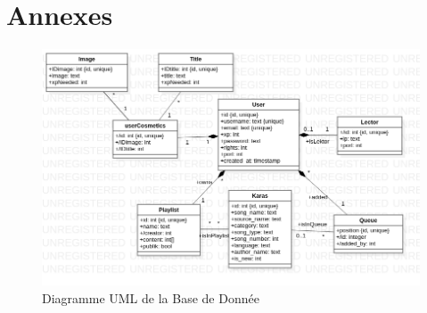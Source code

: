 \section{Annexes}

\begin{figure}
    \begin{center}
        \includegraphics[width=160mm]{UML.png}
        \caption{Diagramme UML de la Base de Donnée}
    \end{center}
\end{figure}
